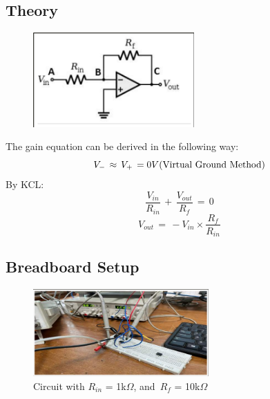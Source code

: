 \documentclass{article}
\begin{document}
\subsection{Theory}
\begin{figure}
\includegraphics[width=0.55\textwidth]{i6.png}
\end{figure}
The gain equation can be derived in the following way:\\
\begin{equation}
    V_{-}\, \approx\, V_{+}\, = 0V(\textrm{Virtual Ground Method})\\
\end{equation}
By KCL:
\begin{equation}
    \frac{V_{in}}{R_{in}}\, +\, \frac{V_{out}}{R_{f}}\, =\, 0
\end{equation}
\begin{equation}
    V_{out}\, =\, -V_{in}\times \frac{R_{f}}{R_{in}}
\end{equation}
\subsection{Breadboard Setup}
\begin{figure}[h!]
\centering
    \includegraphics[width=0.6\textwidth]{i7.png}
    \caption{Circuit with $R_{in}$ = 1k$\Omega$, \textrm{and}\, $R_{f}$ = 10k$\Omega$}
\end{figure}
\end{document}
